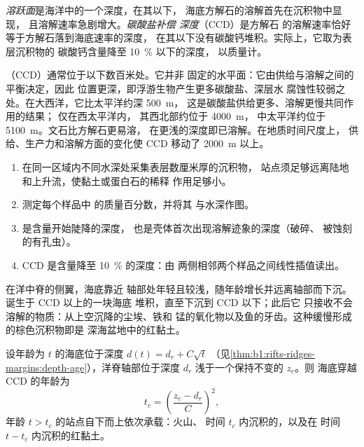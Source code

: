 \begin{definition}\label{def:b1:chemical-biogenic-sediments:ccd}
\emph{溶跃面}是海洋中的一个深度，在其以下，
海底方解石的溶解首先在沉积物中显现，
且溶解速率急剧增大。\emph{碳酸盐补偿
深度}（CCD）是方解石
的溶解速率恰好等于方解石落到海底速率的深度，
在其以下没有碳酸钙堆积。实际上，它取为表层沉积物的
碳酸钙含量降至 \qty{10}{\%} 以下的深度，
以质量计。
\end{definition}

（CCD）通常位于以下数百米处。它并非
固定的水平面：它由供给与溶解之间的平衡决定，因此
位置更深，即浮游生物产生更多碳酸盐、深层水
腐蚀性较弱之处。在大西洋，它比太平洋约深 \qty{500}{m}，
这是碳酸盐供给更多、溶解更慢共同作用的结果；
仅在西太平洋内，
其西北部约位于 \qty{4000}{m}，
中太平洋约位于 \qty{5100}{m}。文石比方解石更易溶，
在更浅的深度即已溶解。在地质时间尺度上，
供给、生产力和溶解方面的变化使 CCD 移动了
\qty{2000}{m} 以上。

\begin{method}\label{met:b1:chemical-biogenic-sediments:ccd}
\begin{enumerate}
  \item 在同一区域内不同水深处采集表层数厘米厚的沉积物，
        站点须足够远离陆地和上升流，使黏土或蛋白石的稀释
        作用足够小。
  \item 测定每个样品中  的质量百分数，并将其
        与水深作图。
  \item {}是含量开始陡降的深度，
        也是壳体首次出现溶解迹象的深度（破碎、
        被蚀刻的有孔虫）。
  \item CCD 是含量降至 \qty{10}{\%} 的深度：由
        两侧相邻两个样品之间线性插值读出。
\end{enumerate}
\end{method}

在洋中脊的侧翼，海底靠近
轴部处年轻且较浅，随年龄增长并远离轴部而下沉。诞生于 CCD 以上的一块海底
堆积，直至下沉到 CCD 以下；此后它
只接收不会溶解的物质：从上空沉降的尘埃、铁和
锰的氧化物以及鱼的牙齿。这种缓慢形成的棕色沉积物即是
深海盆地中的红黏土。

\begin{proposition}[穿越 CCD]\label{prop:b1:chemical-biogenic-sediments:flank}
设年龄为 $t$ 的海底位于深度 $d(t) = d_r + C\sqrt t$
（见\cref{thm:b1:rifts-ridges-margins:depth-age}），洋脊轴部位于深度 $d_r$
浅于一个保持不变的 $z_c$。则
海底穿越 CCD 的年龄为
\[
t_c = \left(\frac{z_c - d_r}{C}\right)^2 ,
\]
年龄 $t > t_c$ 的站点自下而上依次承载：火山、
时间 $t_c$ 内沉积的，以及在
时间 $t - t_c$ 内沉积的红黏土。
\end{proposition}


